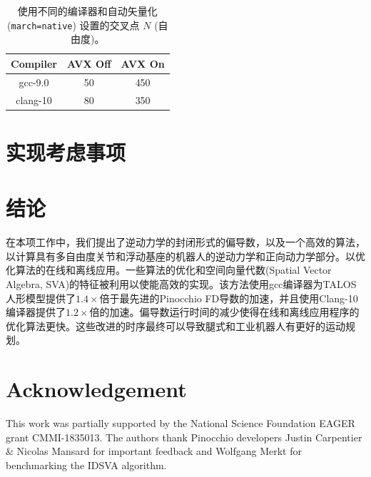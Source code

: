 \documentclass[letterpaper, 10 pt, conference]{ieeetran}  %
\begin{document}
\begin{table}[tb]
\centering
\begin{tabular}{ |c|c|c| } 
 \hline
 Compiler & AVX Off & AVX On \\ 
  \hline
 gcc-9.0 & 50 & 450 \\ 
 clang-10 & 80 & 350 \\ 
 \hline
\end{tabular}
 \caption{使用不同的编译器和自动矢量化 (\texttt{march=native}) 设置的交叉点 $N$ (自由度)。}
  \label{table_ipr}
\end{table}

 




\section{实现考虑事项}
\label{sec:efficient_SVA}



\section{结论}
在本项工作中，我们提出了逆动力学的封闭形式的偏导数，以及一个高效的算法，以计算具有多自由度关节和浮动基座的机器人的逆动力学和正向动力学部分。以优化算法的在线和离线应用。一些算法的优化和空间向量代数(Spatial Vector Algebra, SVA)的特征被利用以使能高效的实现。该方法使用gcc编译器为TALOS人形模型提供了$1.4 \times$倍于最先进的Pinocchio FD导数的加速，并且使用Clang-10编译器提供了$1.2 \times$倍的加速。偏导数运行时间的减少使得在线和离线应用程序的优化算法更快。这些改进的时序最终可以导致腿式和工业机器人有更好的运动规划。


\section{Acknowledgement}
This work was partially supported by the National Science Foundation EAGER grant CMMI-1835013. The authors thank Pinocchio developers Justin Carpentier \& Nicolas Mansard for important feedback and Wolfgang Merkt for benchmarking the IDSVA algorithm.

%
%
%
\end{document}
